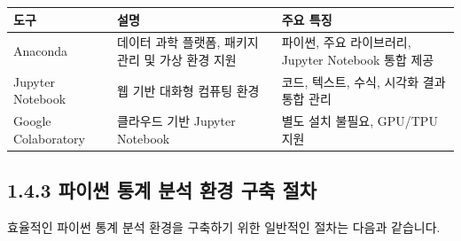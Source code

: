 \documentclass[
  letterpaper,
]{book}
\begin{document}
\begin{itemize}
  \begin{longtable}[]{@{}
    >{\centering\arraybackslash}p{}
    >{\centering\arraybackslash}p{}
    >{\centering\arraybackslash}p{}@{}}
  \toprule\noalign{}
  \begin{minipage}[b]{\linewidth}\centering
  도구
  \end{minipage} & \begin{minipage}[b]{\linewidth}\centering
  설명
  \end{minipage} & \begin{minipage}[b]{\linewidth}\centering
  주요 특징
  \end{minipage} \\
  \midrule\noalign{}
  \endhead
  \bottomrule\noalign{}
  \endlastfoot
  Anaconda & 데이터 과학 플랫폼, 패키지 관리 및 가상 환경 지원 & 파이썬,
  주요 라이브러리, Jupyter Notebook 통합 제공 \\
  Jupyter Notebook & 웹 기반 대화형 컴퓨팅 환경 & 코드, 텍스트, 수식,
  시각화 결과 통합 관리 \\
  Google Colaboratory & 클라우드 기반 Jupyter Notebook & 별도 설치
  불필요, GPU/TPU 지원 \\
  \end{longtable}
\end{itemize}

\subsection{1.4.3 파이썬 통계 분석 환경 구축
절차}\label{uxd30cuxc774uxc36c-uxd1b5uxacc4-uxbd84uxc11d-uxd658uxacbd-uxad6cuxcd95-uxc808uxcc28}

효율적인 파이썬 통계 분석 환경을 구축하기 위한 일반적인 절차는 다음과
같습니다.
\end{document}
